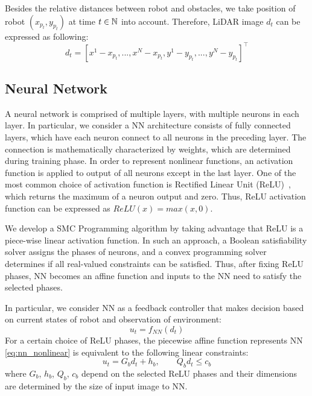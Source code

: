 Besides the relative distances between robot and obstacles, we take position of robot $(x_{p_t}, y_{p_t})$
at time $t \in {\mathbb{N}}$ into account.
Therefore, LiDAR image $d_t$ can be expressed as following:
\begin{equation}
    \label{eq:image}
    d_t = [x^1-x_{p_t},..., x^N-x_{p_t}, y^1-y_{p_t},..., y^N-y_{p_t}]^\intercal
\end{equation}




\subsection{Neural Network}

A neural network is comprised of multiple layers, with multiple neurons in each layer. 
In particular, we consider a NN architecture consists of fully connected layers, which have each neuron connect
to all neurons in the preceding layer.
The connection is mathematically characterized by weights, which are determined during training phase.
In order to represent nonlinear functions, an activation function is applied to output of all neurons except in the last layer.
One of the most common choice of activation function is Rectified Linear Unit (ReLU)~\cite{Hinton2010ReLU},
which returns the maximum of a neuron output and zero. 
Thus, ReLU activation function can be expressed as $ReLU(x) = max(x, 0)$.

We develop a SMC Programming algorithm by taking advantage that ReLU is a piece-wise linear activation function.
In such an approach, a Boolean satisfiability solver assigns the phases of neurons, and a convex programming solver
determines if all real-valued constraints can be satisfied. 
Thus, after fixing ReLU phases, NN becomes an affine function and inputs to the NN need to satisfy the selected phases. 

In particular, we consider NN as a feedback controller that makes decision based on current states of robot and observation of environment:
\begin{equation}    
    \label{eq:nn_nonlinear}    
    u_t = f_{NN}(d_t)
\end{equation}    
For a certain choice of ReLU phases, the piecewise affine function represents NN \eqref{eq:nn_nonlinear} is equivalent to the following linear constraints:
\begin{equation}
    \label{eq:nn_linear}  
    u_t =  G_b d_t + h_b, \qquad Q_b d_t \le c_b
\end{equation}
where $G_b$, $h_b$, $Q_b$, $c_b$ depend on the selected ReLU phases and their dimensions are determined by the size of input image to NN.



